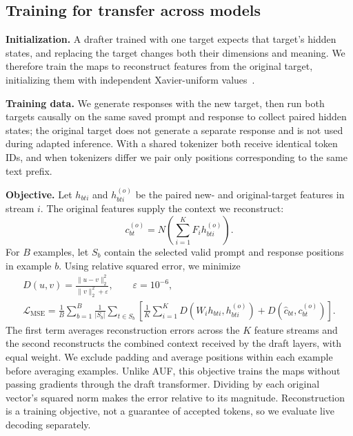 \subsection{Training for transfer across models}
\label{sec:method-mse}
\textbf{Initialization.} A drafter trained with one target expects that target's hidden states, and replacing the target changes both their dimensions and meaning. We therefore train the maps to reconstruct features from the original target, initializing them with independent Xavier-uniform values~\citep{glorot2010initialization}.

\textbf{Training data.} We generate responses with the new target, then run both targets causally on the same saved prompt and response to collect paired hidden states; the original target does not generate a separate response and is not used during adapted inference. With a shared tokenizer both receive identical token IDs, and when tokenizers differ we pair only positions corresponding to the same text prefix.

\textbf{Objective.} Let $h_{bti}$ and $h^{(o)}_{bti}$ be the paired new- and original-target features in stream $i$. The original features supply the context we reconstruct:
\begin{equation}
 c^{(o)}_{bt}=N\!\left(\sum_{i=1}^{K}F_i h^{(o)}_{bti}\right).
 \label{eq:original-context}
\end{equation}
For $B$ examples, let $S_b$ contain the selected valid prompt and response positions in example $b$. Using relative squared error, we minimize
\begin{gather}
 D(u,v)=\frac{\lVert u-v\rVert_2^2}{\lVert v\rVert_2^2+\varepsilon},
 \qquad \varepsilon=10^{-6},
 \label{eq:relative-error}\\
 \mathcal L_{\mathrm{MSE}}
 =\frac1B\sum_{b=1}^{B}\frac1{|S_b|}\sum_{t\in S_b}
 \left[\frac1K\sum_{i=1}^{K}D(W_i h_{bti},h^{(o)}_{bti})
 +D(\widehat c_{bt},c^{(o)}_{bt})\right].
 \label{eq:mse-method}
\end{gather}
The first term averages reconstruction errors across the $K$ feature streams and the second reconstructs the combined context received by the draft layers, with equal weight. We exclude padding and average positions within each example before averaging examples. Unlike AUF, this objective trains the maps without passing gradients through the draft transformer. Dividing by each original vector's squared norm makes the error relative to its magnitude. Reconstruction is a training objective, not a guarantee of accepted tokens, so we evaluate live decoding separately.

